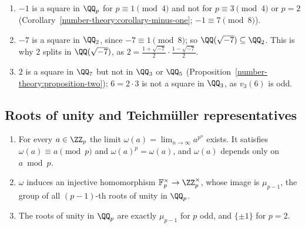 \begin{example}\label{p-adic-numbers:example-squares}
\begin{enumerate}
\item $-1$ is a square in $\QQ_p$ for $p \equiv 1 \pmod 4$ and not for $p \equiv 3 \pmod 4$ or $p = 2$ (Corollary~\ref{number-theory:corollary-minus-one}; $-1 \equiv 7 \pmod 8$).
\item $-7$ is a square in $\QQ_2$, since $-7 \equiv 1 \pmod 8$; so $\QQ(\sqrt{-7}) \subseteq \QQ_2$. This is why $2$ splits in $\QQ(\sqrt{-7})$, as $2 = \frac{1 + \sqrt{-7}}{2}\cdot\frac{1 - \sqrt{-7}}{2}$.
\item $2$ is a square in $\QQ_7$ but not in $\QQ_3$ or $\QQ_5$ (Proposition~\ref{number-theory:proposition-two}); $6 = 2 \cdot 3$ is not a square in $\QQ_3$, as $v_3(6)$ is odd.
\end{enumerate}
\end{example}

\subsection{Roots of unity and Teichm\"uller representatives}\label{p-adic-numbers:subsection-teichmuller}

\begin{proposition}\label{p-adic-numbers:proposition-roots-of-unity}
\begin{enumerate}
\item For every $a \in \ZZ_p$ the limit $\omega(a) = \lim_{n \to \infty}a^{p^n}$ exists. It satisfies $\omega(a) \equiv a \pmod p$ and $\omega(a)^p = \omega(a)$, and $\omega(a)$ depends only on $a \bmod p$.
\item $\omega$ induces an injective homomorphism $\mathbb{F}_p^\times \to \ZZ_p^\times$, whose image is $\mu_{p-1}$, the group of all $(p-1)$-th roots of unity in $\QQ_p$.
\item The roots of unity in $\QQ_p$ are exactly $\mu_{p-1}$ for $p$ odd, and $\{\pm1\}$ for $p = 2$.
\end{enumerate}
\end{proposition}

